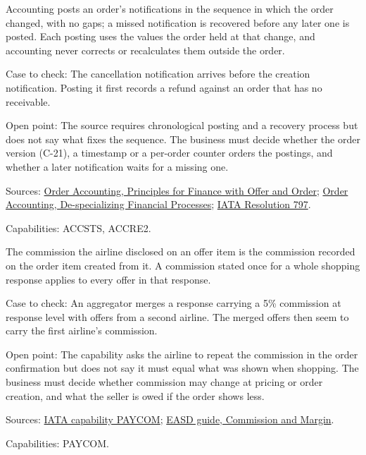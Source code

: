 \begin{theorem}
  \label{thm:accounting-accounting-in-sequence}
  \notready
  Accounting posts an order's notifications in the sequence in which the
  order changed, with no gaps; a missed notification is recovered before any
  later one is posted. Each posting uses the values the order held at that
  change, and accounting never corrects or recalculates them outside the
  order.

  Case to check: The cancellation notification arrives before the creation
  notification. Posting it first records a refund against an order that has
  no receivable.

  Open point: The source requires chronological posting and a recovery
  process but does not say what fixes the sequence. The business must decide
  whether the order version (C-21), a timestamp or a per-order counter
  orders the postings, and whether a later notification waits for a missing
  one.

  Sources: \href{https://standards.atlassian.net/wiki/spaces/OA/pages/617185366}{Order Accounting, Principles for Finance with Offer and Order};
  \href{https://standards.atlassian.net/wiki/spaces/OA/pages/617185338}{Order Accounting, De-specializing Financial Processes};
  \href{https://www.iata.org/contentassets/72cbd60393ff42b5975d90ce9e049a7d/oneorder-resolution-797.pdf}{IATA Resolution 797}.

  Capabilities: ACCSTS, ACCRE2.
\end{theorem}

\begin{theorem}
  \label{thm:accounting-commission-offer-to-order}
  \notready
  The commission the airline disclosed on an offer item is the commission
  recorded on the order item created from it. A commission stated once for a
  whole shopping response applies to every offer in that response.

  Case to check: An aggregator merges a response carrying a 5\% commission
  at response level with offers from a second airline. The merged offers
  then seem to carry the first airline's commission.

  Open point: The capability asks the airline to repeat the commission in
  the order confirmation but does not say it must equal what was shown when
  shopping. The business must decide whether commission may change at
  pricing or order creation, and what the seller is owed if the order shows
  less.

  Sources: \href{https://retailing.iata.org/armi/docs/PAYCOM/}{IATA capability PAYCOM};
  \href{https://standards.atlassian.net/wiki/spaces/EASD/pages/574849050}{EASD guide, Commission and Margin}.

  Capabilities: PAYCOM.
\end{theorem}


